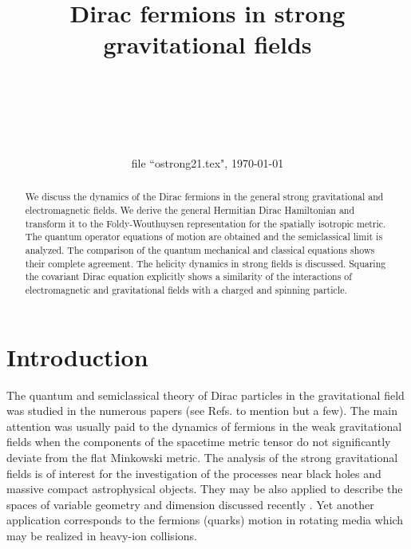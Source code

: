 \documentclass[preprint,showpacs,preprintnumbers,eqsecnum,amsmath,amssymb]{revtex4}
\begin{document}

\title{Dirac fermions in strong gravitational fields}

\author{~}
 

\author{~}
 

\author{~}
 

\date{file ``ostrong21.tex", \today}

\begin {abstract}
We discuss the dynamics of the Dirac fermions in the general strong 
gravitational and electromagnetic fields. We derive the general Hermitian
Dirac Hamiltonian and transform it to the Foldy-Wouthuysen representation 
for the spatially isotropic metric. The quantum operator equations of motion 
are obtained and the semiclassical limit is analyzed.
The comparison of the quantum mechanical and classical equations
shows their complete agreement. The helicity dynamics in strong
fields is discussed. Squaring the covariant Dirac equation
explicitly shows a similarity of the interactions of
electromagnetic and gravitational fields with a charged and
spinning particle.
\end{abstract}

 \maketitle


\section{Introduction}


The quantum and semiclassical theory of Dirac particles in the
gravitational field was studied in the numerous papers (see Refs.
\cite{Oliveira} to mention but a few). The main attention was usually paid 
to the dynamics of fermions in the weak gravitational fields when the 
components of the spacetime metric tensor do not significantly deviate from 
the flat Minkowski metric. The analysis of the strong gravitational fields 
is of interest for the investigation of the processes near black holes and 
massive compact astrophysical objects. They may be also applied to describe 
the spaces of variable geometry and dimension discussed recently
\cite{Fiziev:2010je,Mureika:2011bv,Sotiriou:2011xy}. 
Yet another application corresponds to the fermions (quarks) motion in 
rotating media which may be realized \cite{Rogachevsky:2010ys}
in heavy-ion collisions.  
\end{document}
